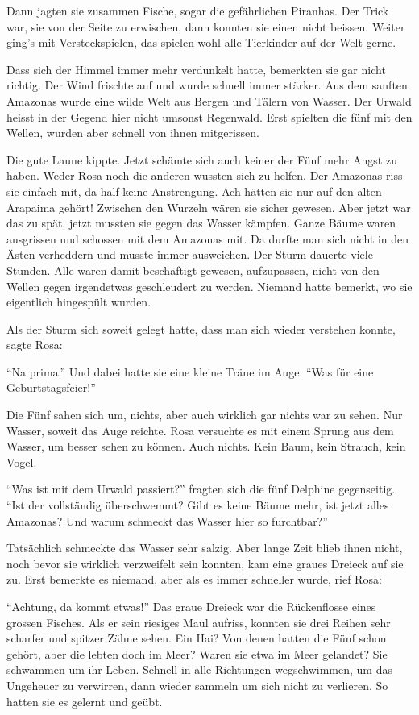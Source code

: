 Dann jagten sie zusammen Fische, sogar die gefährlichen Piranhas. Der Trick war, sie von der Seite zu erwischen, dann konnten sie einen nicht beissen. Weiter ging's mit Versteckspielen, das spielen wohl alle Tierkinder auf der Welt gerne.

Dass sich der Himmel immer mehr verdunkelt hatte, bemerkten sie gar nicht richtig. Der Wind frischte auf und wurde schnell immer stärker. Aus dem sanften Amazonas wurde eine wilde Welt aus Bergen und Tälern von Wasser. Der Urwald heisst in der Gegend hier nicht umsonst Regenwald. Erst spielten die fünf mit den Wellen, wurden aber schnell von ihnen mitgerissen.

Die gute Laune kippte. Jetzt schämte sich auch keiner der Fünf mehr Angst zu haben. Weder Rosa noch die anderen wussten sich zu helfen. Der Amazonas riss sie einfach mit, da half keine Anstrengung. Ach hätten sie nur auf den alten Arapaima gehört! Zwischen den Wurzeln wären sie sicher gewesen. Aber jetzt war das zu spät, jetzt mussten sie gegen das Wasser kämpfen. Ganze Bäume waren ausgrissen und schossen mit dem Amazonas mit. Da durfte man sich nicht in den Ästen verheddern und musste immer ausweichen. Der Sturm dauerte viele Stunden. Alle waren damit beschäftigt gewesen, aufzupassen, nicht von den Wellen gegen irgendetwas geschleudert zu werden. Niemand hatte bemerkt, wo sie eigentlich hingespült wurden.

Als der Sturm sich soweit gelegt hatte, dass man sich wieder verstehen konnte, sagte Rosa:

\enquote{Na prima.} Und dabei hatte sie eine kleine Träne im Auge. \enquote{Was für eine Geburtstagsfeier!}

Die Fünf sahen sich um, nichts, aber auch wirklich gar nichts war zu sehen. Nur Wasser, soweit das Auge reichte. Rosa versuchte es mit einem Sprung aus dem Wasser, um besser sehen zu können. Auch nichts. Kein Baum, kein Strauch, kein Vogel.

\enquote{Was ist mit dem Urwald passiert?} fragten sich die fünf Delphine gegenseitig. \enquote{Ist der vollständig überschwemmt? Gibt es keine Bäume mehr, ist jetzt alles Amazonas? Und warum schmeckt das Wasser hier so furchtbar?} 

Tatsächlich schmeckte das Wasser sehr salzig. Aber lange Zeit blieb ihnen nicht, noch bevor sie wirklich verzweifelt sein konnten, kam eine graues Dreieck auf sie zu. Erst bemerkte es niemand, aber als es immer schneller wurde, rief Rosa:

\enquote{Achtung, da kommt etwas!} Das graue Dreieck war die Rückenflosse eines grossen Fisches. Als er sein riesiges Maul aufriss, konnten sie drei Reihen sehr scharfer und spitzer Zähne sehen. Ein Hai? Von denen hatten die Fünf schon gehört, aber die lebten doch im Meer? Waren sie etwa im Meer gelandet? Sie schwammen um ihr Leben. Schnell in alle Richtungen wegschwimmen, um das Ungeheuer zu verwirren, dann wieder sammeln um sich nicht zu verlieren. So hatten sie es gelernt und geübt.


